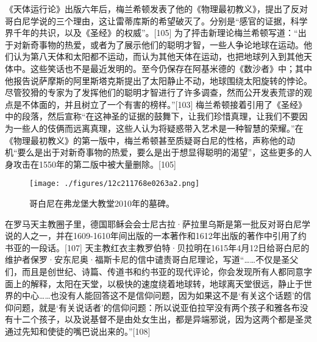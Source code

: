《天体运行论》出版六年后，梅兰希顿发表了他的《物理最初教义》，提出了反对哥白尼学说的三个理由，这让雷蒂库斯的希望破灭了。分别是“感官的证据，科学界千年的共识，以及《圣经》的权威”。[105] 为了抨击新理论梅兰希顿写道：“出于对新奇事物的热爱，或者为了展示他们的聪明才智，一些人争论地球在运动。他们认为第八天体和太阳都不运动，而认为其他天体在运动，也把地球列入到其他天体中。这些笑话也不是最近发明的。至今仍保存在阿基米德的《数沙者》中；其中他报告说萨摩斯的阿里斯塔克斯提出了太阳静止不动，地球围绕太阳旋转的悖论。尽管狡猾的专家为了发挥他们的聪明才智进行了许多调查，然而公开发表荒谬的观点是不体面的，并且树立了一个有害的榜样。”[103] 梅兰希顿接着引用了《圣经》中的段落，然后宣称“在这神圣的证据的鼓舞下，让我们珍惜真理，让我们不要因为一些人的伎俩而远离真理，这些人认为将疑惑带入艺术是一种智慧的荣耀。”在《物理最初教义》的第一版中，梅兰希顿甚至质疑哥白尼的性格，声称他的动机“要么是出于对新奇事物的热爱，要么是出于想显得聪明的渴望”，这些更多的人身攻击在1550年的第二版中被大量删除。[105]
\begin{figure}[ht]
\centering
\texttt{[image: ./figures/12c211768e0263a2.png]}
\caption{哥白尼在弗龙堡大教堂2010年的墓碑。} \label{fig_GBN_26}
\end{figure}
在罗马天主教圈子里，德国耶稣会会士尼古拉·萨拉里乌斯是第一批反对哥白尼学说的人之一，并在1609-1610年间出版的一本著作和1612年出版的著作中引用了约书亚的一段话。[107] 天主教红衣主教罗伯特·贝拉明在1615年4月12日给哥白尼的维护者保罗·安东尼奥·福斯卡尼的信中谴责哥白尼理论，写道“……不仅是圣父们，而且是创世纪、诗篇、传道书和约书亚的现代评论，你会发现所有人都同意字面上的解释，太阳在天堂，以极快的速度绕着地球转，地球离天堂很远，静止于世界的中心……也没有人能回答这不是信仰问题，因为如果这不是‘有关这个话题’的信仰问题，就是‘有关说话者’的信仰问题：所以说亚伯拉罕没有两个孩子和雅各布没有十二个孩子，以及说基督不是由处女生出，都是异端邪说，因为这两个都是圣灵通过先知和使徒的嘴巴说出来的。”[108]

